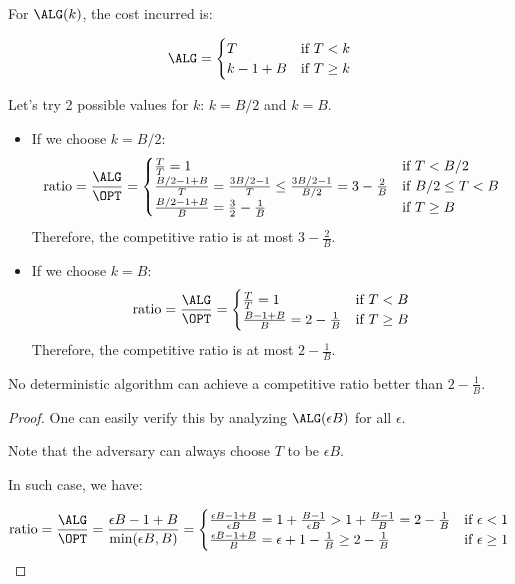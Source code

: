 For $\ALG(k)$, the cost incurred is:

\[ \ALG = \begin{cases}
  T & \text{if } T < k \\
  k - 1 + B & \text{if } T \geq k
\end{cases} \]

Let's try 2 possible values for $k$: $k = B/2$ and $k = B$.

\begin{itemize}
  \item If we choose $k = B/2$:
    \[ \text{ratio} = \frac{\ALG}{\OPT} = \begin{cases}
      \frac{T}{T} = 1 & \text{if } T < B/2 \\
      \frac{B/2 - 1 + B}{T} = \frac{3B/2 - 1}{T} \leq \frac{3B/2 - 1}{B/2} = 3 - \frac{2}{B} & \text{if } B/2 \leq T < B \\
      \frac{B/2 - 1 + B}{B} = \frac{3}{2} - \frac{1}{B} & \text{if } T \geq B
    \end{cases} \]
    Therefore, the competitive ratio is at most $3 - \frac{2}{B}$.

  \item If we choose $k = B$:
    \[ \text{ratio} = \frac{\ALG}{\OPT} = \begin{cases}
      \frac{T}{T} = 1 & \text{if } T < B \\
      \frac{B - 1 + B}{B} = 2 - \frac{1}{B} & \text{if } T \geq B
    \end{cases} \]
    Therefore, the competitive ratio is at most $2 - \frac{1}{B}$.
\end{itemize}

\begin{theorem}
  No deterministic algorithm can achieve a competitive ratio better than $2 - \frac{1}{B}$.
\end{theorem}

\begin{proof}
One can easily verify this by analyzing $\ALG(\epsilon B)$ for all $\epsilon$. 

Note that the adversary can always choose $T$ to be $\epsilon B$.

In such case, we have:

\[ \text{ratio} = \frac{\ALG}{\OPT} = \frac{\epsilon B - 1 + B}{\min(\epsilon B, B)} = \begin{cases}
  \frac{\epsilon B - 1 + B}{\epsilon B} = 1 + \frac{B - 1}{\epsilon B} > 1 + \frac{B - 1}{B} = 2 - \frac{1}{B}  & \text{if } \epsilon < 1 \\
  \frac{\epsilon B - 1 + B}{B} = \epsilon + 1 - \frac{1}{B} \geq 2 - \frac{1}{B}  & \text{if } \epsilon \geq 1
  \end{cases} \]
\end{proof}

